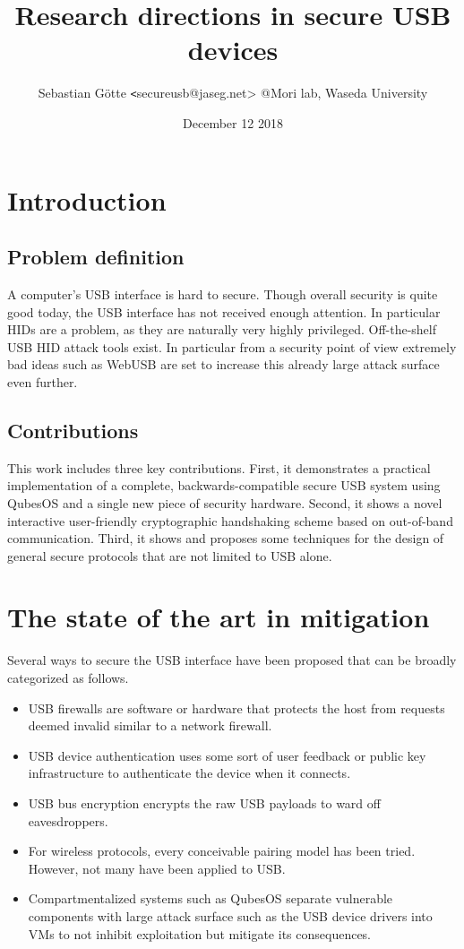 \documentclass[12pt,a4paper,notitlepage]{article}
\author{Sebastian Götte {\texttt<secureusb@jaseg.net>} @Mori lab, Waseda University}
\title{Research directions in secure USB devices}
\date{December 12 2018}
\begin{document}
\maketitle

\section{Introduction}
\subsection{Problem definition}
A computer's USB interface is hard to secure. Though overall security is quite good today, the USB interface has not
received enough attention. In particular HIDs are a problem, as they are naturally very highly privileged.
Off-the-shelf USB HID attack tools exist. In particular from a security point of view extremely bad ideas such as
WebUSB\cite{misc01} are set to increase this already large attack surface even further.

\subsection{Contributions}
This work includes three key contributions. First, it demonstrates a practical implementation of a complete,
backwards-compatible secure USB system using QubesOS and a single new piece of security hardware.  Second, it shows a
novel interactive user-friendly cryptographic handshaking scheme based on out-of-band communication. Third, it shows and
proposes some techniques for the design of general secure protocols that are not limited to USB alone.

\section{The state of the art in mitigation}
Several ways to secure the USB interface have been proposed that can be broadly categorized as follows.
\begin{itemize}
    \item USB firewalls are software or hardware that protects the host from requests deemed invalid similar to a network firewall\cite{tian01,angel01,kang01,bates01,loe01}.
    \item USB device authentication uses some sort of user feedback or public key infrastructure to authenticate the device when it connects\cite{usb01,griscioli01,wang01,he01}.
    \item USB bus encryption encrypts the raw USB payloads to ward off eavesdroppers\cite{neugschwandtner01,weinstein01}.
    \item For wireless protocols, every conceivable pairing model has been tried. However, not many have been applied to
        USB\cite{arun01,uzun01,kobsa01,saxena01}.
    \item Compartmentalized systems such as QubesOS separate vulnerable components with large attack surface such as the USB device drivers into VMs to not inhibit exploitation but mitigate its consequences.
\end{itemize}
\end{document}

